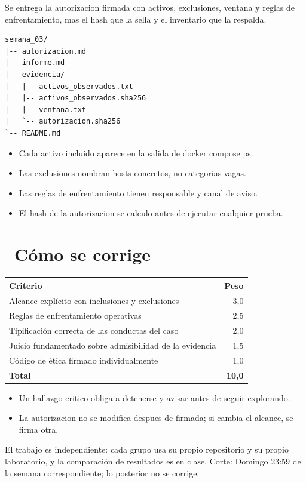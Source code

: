 \documentclass[11pt,a4paper]{article}
\newcommand{\iconotexto}[2]{\textcolor{cyanNeon}{\faIcon{#1}}~#2}
\begin{document}
Se entrega la autorizacion firmada con activos, exclusiones, ventana y reglas de enfrentamiento, mas el hash que la sella y el inventario que la respalda.

\begin{lstlisting}[style=estiloCodigo]
semana_03/
|-- autorizacion.md
|-- informe.md
|-- evidencia/
|   |-- activos_observados.txt
|   |-- activos_observados.sha256
|   |-- ventana.txt
|   `-- autorizacion.sha256
`-- README.md
\end{lstlisting}

\begin{itemize}[leftmargin=1.4em,itemsep=2pt,topsep=3pt]
  \item Cada activo incluido aparece en la salida de docker compose ps.
  \item Las exclusiones nombran hosts concretos, no categorias vagas.
  \item Las reglas de enfrentamiento tienen responsable y canal de aviso.
  \item El hash de la autorizacion se calculo antes de ejecutar cualquier prueba.
\end{itemize}

\section{\iconotexto{ruler-combined}{Cómo se corrige}}

\begin{tabularx}{\linewidth}{@{}X r@{}}
\toprule
Criterio & Peso\\
\midrule
Alcance explícito con inclusiones y exclusiones & 3,0 \\
Reglas de enfrentamiento operativas & 2,5 \\
Tipificación correcta de las conductas del caso & 2,0 \\
Juicio fundamentado sobre admisibilidad de la evidencia & 1,5 \\
Código de ética firmado individualmente & 1,0 \\
\midrule
\textbf{Total} & \textbf{10,0}\\
\bottomrule
\end{tabularx}

\begin{itemize}[leftmargin=1.4em,itemsep=2pt,topsep=3pt]
  \item Un hallazgo critico obliga a detenerse y avisar antes de seguir explorando.
  \item La autorizacion no se modifica despues de firmada; si cambia el alcance, se firma otra.
\end{itemize}

\begin{cajaRecuerda}El trabajo es independiente: cada grupo usa su propio repositorio y su propio laboratorio, y la comparación de resultados es en clase. Corte: Domingo 23:59 de la semana correspondiente; lo posterior no se corrige.
\end{cajaRecuerda}
\end{document}
